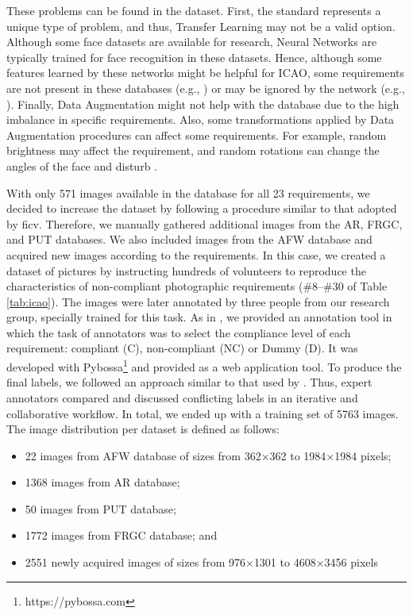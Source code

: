 These problems can be found in the \ficvtest dataset. First, the \icao standard represents a unique type of problem, and thus, Transfer Learning may not be a valid option. Although some face datasets are available for research, Neural Networks are typically trained for face recognition in these datasets. Hence, although some features learned by these networks might be helpful for ICAO, some requirements are not present in these databases (e.g., \inkmarked) or may be ignored by the network (e.g., \variedbackground). Finally, Data Augmentation might not help with the \ficvtest database due to the high imbalance in specific requirements. Also, some transformations applied by Data Augmentation procedures can affect some requirements. For example, random brightness may affect the \toodarklight requirement, and random rotations can change the angles of the face and disturb \rollpitchyaw.
 
With only 571 images available in the \ficvtest database for all 23 requirements, we decided to increase the dataset by following a procedure similar to that adopted by \acs{ficv}. Therefore, we manually gathered additional images from the AR, FRGC, and PUT databases. We also included images from the AFW database \citep{databaseAFW} and acquired new images according to the \icao requirements. In this case, we created a dataset of pictures by instructing hundreds of volunteers to reproduce the characteristics of non-compliant photographic requirements (\#8--\#30 of Table \ref{tab:icao}). The images were later annotated by three people from our research group, specially trained for this task. As in \citep{Nowak2010}, we provided an annotation tool in which the task of annotators was to select the compliance level of each requirement: compliant (C), non-compliant (NC) or Dummy (D). It was developed with Pybossa\footnote{https://pybossa.com} and provided as a web application tool. To produce the final labels, we followed an approach similar to that used by \citep{Chang2017}. Thus, expert annotators compared and discussed conflicting labels in an iterative and collaborative workflow. In total, we ended up with a training set of 5763 images. The image distribution per dataset is defined as follows:
 
\begin{itemize}
\item 22 images from AFW database of sizes from 362$\times$362 to 1984$\times$1984 pixels;
\item 1368 images from AR database;
\item 50 images from PUT database;
\item 1772 images from FRGC database; and
\item 2551 newly acquired images of sizes from 976$\times$1301 to 4608$\times$3456 pixels
\end{itemize}
 
